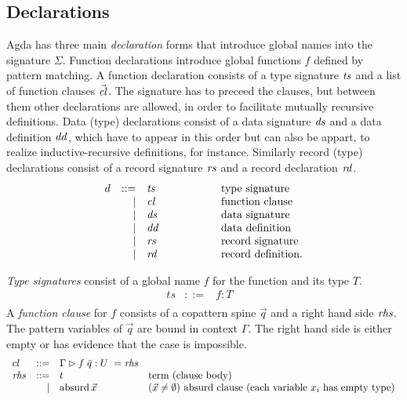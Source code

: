 \documentclass[acmlarge,fleqn]{acmart}\settopmatter{}
\begin{document}
\subsection{Declarations}
\label{sec:declarations}

Agda has three main \emph{declaration} forms that introduce global names into
the signature $\Sigma$.  Function declarations introduce global
functions $f$ defined by pattern matching.  A function declaration
consists of a type signature $\mathit{ts}$ and a list of function clauses
$\vec{\mathit{cl}}$.  The signature has to preceed the clauses, but between
them other declarations are allowed, in order to facilitate mutually
recursive definitions.  Data (type) declarations consist of a data
signature $\mathit{ds}$ and a data definition $\mathit{dd}$, which have to appear in
this order but can also be appart, to realize inductive-recursive
definitions, for instance.  Similarly record (type) declarations
consist of a record signature $\mathit{rs}$ and a record declaration $\mathit{rd}$.
\[
\begin{array}{lrl@{\hspace{2cm}}l}
d  & ::=  & \mathit{ts} & \mbox{type signature}
\\ & \mid & \mathit{cl} & \mbox{function clause}
\\ & \mid & \mathit{ds} & \mbox{data signature}
\\ & \mid & \mathit{dd} & \mbox{data definition}
\\ & \mid & \mathit{rs} & \mbox{record signature}
\\ & \mid & \mathit{rd} & \mbox{record definition}.
\end{array}
 \]

\emph{Type signatures} consist of a global name $f$ for the function and its type $T$.
\[\begin{array}{lrll}
ts &::=& f : T &\\
\end{array} \]
A \emph{function clause} for $f$ consists of a copattern spine $\vec q$ and a right hand side $\mathit{rhs}$.
The pattern variables of $\vec q$ are bound in context $\Gamma$.
The right hand side is either empty or has evidence that the case is impossible.
\[
\begin{array}{lrll}
cl &::=& \Gamma \rhd f\; \bar{q} : U \; = \mathit{rhs}  &\\
\mathit{rhs} & ::= & t & \text{term (clause body)}\\
      & \mid& \text{absurd}\,\vec x  & (\vec x \not=\emptyset)
      \text{ absurd clause (each variable $x_i$ has empty type)} \\
\end{array}
\]
\end{document}

